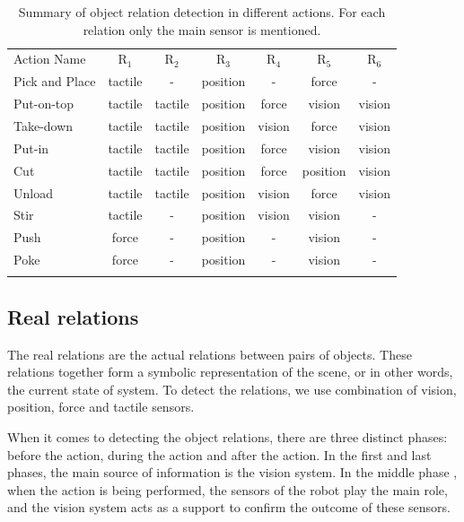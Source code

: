 \begin{table}
\caption{Summary of object relation detection in different actions. For each relation only the main sensor is mentioned.}
\begin{tabular}{ lcccccc }
\hline\noalign{\smallskip}
 Action Name &  $\text{R}_1$ & $\text{R}_2$ &$\text{R}_3$ &$\text{R}_4$ &$\text{R}_5$&$\text{R}_6$ \\
\noalign{\smallskip}\hline\noalign{\smallskip}
 Pick and Place & tactile & -       & position & -     &  force & - \\
 Put-on-top     & tactile & tactile & position & force &  vision & vision \\
 Take-down      & tactile & tactile & position & vision&  force & vision \\
 Put-in         & tactile & tactile & position & force &  vision & vision \\
 Cut            & tactile & tactile & position & force &  position & vision \\
 Unload         & tactile & tactile & position & vision&  force & vision \\
 Stir           & tactile & -       & position & vision&  vision & - \\
 Push           & force   & -       & position & -     &  vision & - \\
 Poke           & force   & -       & position & -     &  vision & - \\
\noalign{\smallskip}\hline
\end{tabular}
\label{tab:relation_detection}
\end{table}
\subsection{Real relations}
\label{sec:real_relations}
The real relations are the actual relations between pairs of objects.
These relations together form a symbolic representation of the scene, or in other words, the current state of system.
To detect the relations, we use combination of vision, position, force and tactile sensors.

When it comes to detecting the object relations, there are three distinct phases: before the action, during the action and after the action.
In the first and last phases, the main source of information is the vision system.
In the middle phase , when the action is being performed, the sensors of the robot play the main role,
and the vision system acts as a support to confirm the outcome of these sensors.

